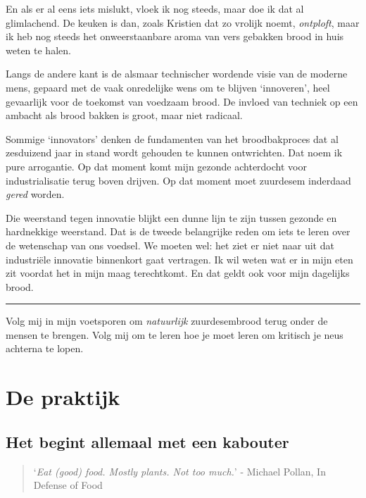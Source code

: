 \documentclass[
  11pt,
  dutch,
]{memoir}
\begin{document}
En als er al eens iets mislukt, vloek ik nog steeds, maar doe ik dat al
glimlachend. De keuken is dan, zoals Kristien dat zo vrolijk noemt,
\emph{ontploft}, maar ik heb nog steeds het onweerstaanbare aroma van
vers gebakken brood in huis weten te halen.

Langs de andere kant is de alsmaar technischer wordende visie van de
moderne mens, gepaard met de vaak onredelijke wens om te blijven
`innoveren', heel gevaarlijk voor de toekomst van voedzaam brood. De
invloed van techniek op een ambacht als brood bakken is groot, maar niet
radicaal.

Sommige `innovators' denken de fundamenten van het broodbakproces dat al
zesduizend jaar in stand wordt gehouden te kunnen ontwrichten. Dat noem
ik pure arrogantie. Op dat moment komt mijn gezonde achterdocht voor
industrialisatie terug boven drijven. Op dat moment moet zuurdesem
inderdaad \emph{gered} worden.

Die weerstand tegen innovatie blijkt een dunne lijn te zijn tussen
gezonde en hardnekkige weerstand. Dat is de tweede belangrijke reden om
iets te leren over de wetenschap van ons voedsel. We moeten wel: het
ziet er niet naar uit dat industriële innovatie binnenkort gaat
vertragen. Ik wil weten wat er in mijn eten zit voordat het in mijn maag
terechtkomt. En dat geldt ook voor mijn dagelijks brood.

\pfbreak

Volg mij in mijn voetsporen om \emph{natuurlijk} zuurdesembrood terug
onder de mensen te brengen. Volg mij om te leren hoe je moet leren om
kritisch je neus achterna te lopen.

\mainmatter

\hypertarget{de-praktijk}{%
\part{De praktijk}\label{de-praktijk}}

\label{praktijk}

\hypertarget{het-begint-allemaal-met-een-kabouter}{%
\chapter{Het begint allemaal met een
kabouter}\label{het-begint-allemaal-met-een-kabouter}}

\label{kabouter}

\begin{quote}
`\emph{Eat (good) food. Mostly plants. Not too much.}' - \mbox{Michael}
Pollan, In Defense of Food
\end{quote}
\end{document}
